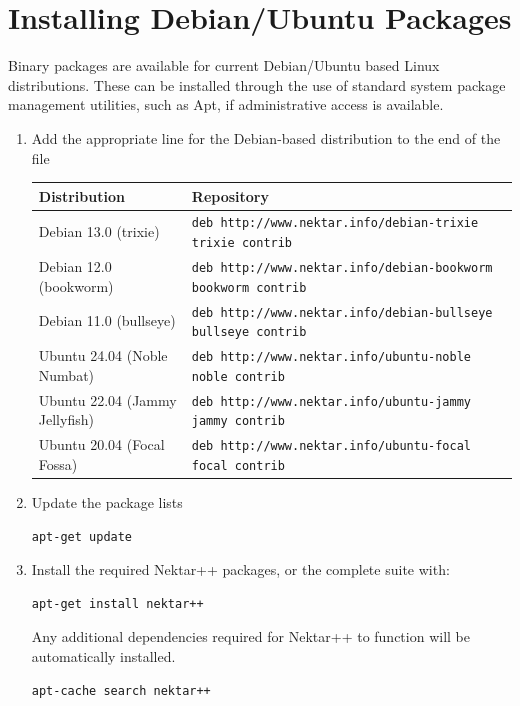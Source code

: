\section{Installing Debian/Ubuntu Packages}
\label{s:installation:debian}
Binary packages are available for current Debian/Ubuntu based Linux
distributions. These can be installed through the use of standard system package
management utilities, such as Apt, if administrative access is
available.

\begin{enumerate}
	\item Add the appropriate line for the Debian-based distribution to the end of
	the file 
	
	{\small
	\begin{tabular}{ll}
	\toprule
	Distribution & Repository \\
	\midrule
        Debian 13.0 (trixie) &
        \texttt{deb http://www.nektar.info/debian-trixie trixie contrib} \\
        Debian 12.0 (bookworm) &
        \texttt{deb http://www.nektar.info/debian-bookworm bookworm contrib} \\
        Debian 11.0 (bullseye) &
        \texttt{deb http://www.nektar.info/debian-bullseye bullseye contrib} \\
	Ubuntu 24.04 (Noble Numbat) & 
	\texttt{deb http://www.nektar.info/ubuntu-noble noble contrib}\\
	Ubuntu 22.04 (Jammy Jellyfish) & 
	\texttt{deb http://www.nektar.info/ubuntu-jammy jammy contrib}\\
	Ubuntu 20.04 (Focal Fossa) & 
	\texttt{deb http://www.nektar.info/ubuntu-focal focal contrib}\\
	\bottomrule
	\end{tabular}
	}
	\item Update the package lists
	\begin{lstlisting}[style=BashInputStyle]
	apt-get update
	\end{lstlisting}
	\item Install the required Nektar++ packages, or the complete suite with:
	\begin{lstlisting}[style=BashInputStyle]
	apt-get install nektar++
	\end{lstlisting}
	Any additional dependencies required for Nektar++ to function will be
	automatically installed.
	
    \newsavebox\installationDebTip
    \begin{lrbox}{\installationDebTip}\begin{minipage}{0.8\linewidth}
    \begin{lstlisting}[style=BashInputStyle]
    apt-cache search nektar++
    \end{lstlisting}
    \end{minipage}
    \end{lrbox}
	

\end{enumerate}
